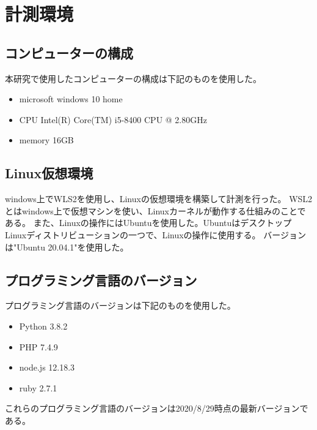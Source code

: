 \chapter{計測環境}
\label{cha:environment}
\section{コンピューターの構成}
本研究で使用したコンピューターの構成は下記のものを使用した。
\begin{itemize}
  \item microsoft windows 10 home
  \item CPU Intel(R) Core(TM) i5-8400 CPU @ 2.80GHz
  \item memory 16GB
\end{itemize}

\section{Linux仮想環境}
windows上でWLS2を使用し、Linuxの仮想環境を構築して計測を行った。
WSL2とはwindows上で仮想マシンを使い、Linuxカーネルが動作する仕組みのことである。
また、Linuxの操作にはUbuntu\cite{Ubuntu}を使用した。UbuntuはデスクトップLinuxディストリビューションの一つで、Linuxの操作に使用する。
バージョンは"Ubuntu 20.04.1"を使用した。

\section{プログラミング言語のバージョン}
プログラミング言語のバージョンは下記のものを使用した。
\begin{itemize}
  \item Python 3.8.2
  \item PHP 7.4.9
　\item node.js 12.18.3
  \item ruby 2.7.1
\end{itemize}
これらのプログラミング言語のバージョンは2020/8/29時点の最新バージョンである。